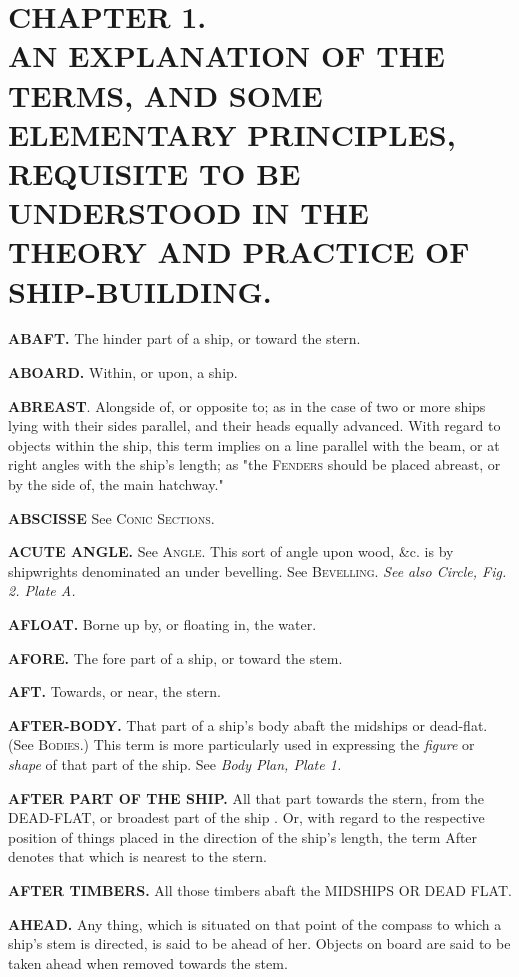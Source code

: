 \chapter[EXPLANATION OF TERMS, \&C. USED IN SHIP-BUILDING]{CHAPTER 1. \\
\footnotesize \singlespacing AN EXPLANATION OF THE TERMS, AND SOME ELEMENTARY PRINCIPLES, REQUISITE TO BE UNDERSTOOD IN THE THEORY AND PRACTICE OF SHIP-BUILDING.}

\textbf{ABAFT.} The hinder part of a ship, or toward the stern.

\textbf{ABOARD.} Within, or upon, a ship. 

\textbf{ABREAST}. Alongside of, or opposite to; as in the case of two or more ships lying with their sides parallel, and their heads equally advanced. With regard to objects within the ship, this term implies on a line parallel with the beam, or at right angles with the ship's length; as "the \textsc{Fenders} should be placed abreast, or by the side of, the main hatchway."

\textbf{ABSCISSE}  See \textsc{Conic Sections}. 

\textbf{ACUTE ANGLE.} See \textsc{Angle}. This sort of angle upon wood, \&c. is by shipwrights denominated an under bevelling. See \textsc{Bevelling}. \textit{See also Circle, Fig. 2. Plate A.}

\textbf{AFLOAT.} Borne up by, or floating in, the water.

\textbf{AFORE.} The fore part of a ship, or toward the stem.

\textbf{AFT.} Towards, or near, the stern. 

\textbf{AFTER-BODY.} That part of a ship's body abaft the midships or dead-flat. (See \textsc{Bodies}.) This term is more particularly used in expressing the \textit{figure} or \textit{shape} of that part of the ship. See \textit{Body Plan, Plate 1.}

\textbf{AFTER PART OF THE SHIP.} All that part towards the stern, from the DEAD-FLAT, or broadest part of the ship . Or, with regard to the respective position of things placed in the direction of the ship's length, the term After denotes that which is nearest to the stern. 

\textbf{AFTER TIMBERS.} All those timbers abaft the MIDSHIPS OR DEAD FLAT. 

\textbf{AHEAD.} Any thing, which is situated on that point of the compass to which a ship's stem is directed, is said to be ahead of her. Objects on board are said to be taken ahead when removed towards the stem. 

